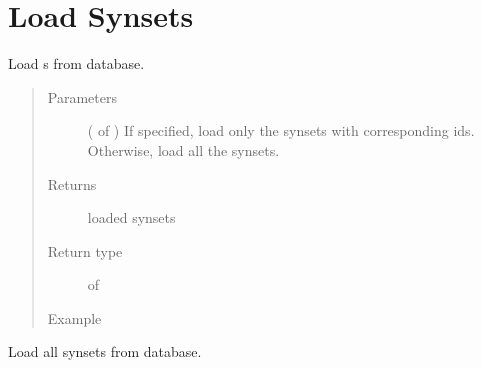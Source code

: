 \documentclass[letterpaper,10pt,english]{sphinxmanual}
\begin{document}
\section{Load Synsets}
\label{\detokenize{load:module-loacore.load.synset_load}}\label{\detokenize{load:load-synsets}}

\begin{fulllineitems}
\label{\detokenize{load:loacore.load.synset_load.load_synsets}}
Load  s from database.
\begin{quote}\begin{description}
\item[{Parameters}] \leavevmode
{} ( of ) \textendash{} If specified, load only the synsets with corresponding ids. Otherwise, load all the synsets.

\item[{Returns}] \leavevmode
loaded synsets

\item[{Return type}] \leavevmode
{} of 

\item[{Example}] \leavevmode
\end{description}\end{quote}

Load all synsets from database.

%
\begin{sphinxVerbatim}[commandchars=\\\{\}]
   
  
\PYG{p}{[}\PYG{p}{]}
\PYG{p}{[}\PYG{p}{]}
\end{sphinxVerbatim}

\end{fulllineitems}
\end{document}
